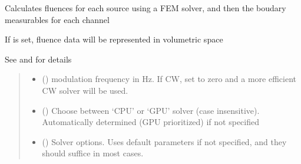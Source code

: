 \documentclass[letterpaper,10pt,english]{sphinxmanual}
\begin{document}
\begin{fulllineitems}
\begin{fulllineitems}
\label{\detokenize{_autosummary/nirfasterff.base.fluor_mesh.fluormesh:nirfasterff.base.fluor_mesh.fluormesh.femdata}}
\pysigstartsignatures
\pysiglinewithargsret
{}
{\sphinxparamcomma {}\sphinxparamcomma {}\sphinxparamcomma {}\sphinxparamcomma {}\sphinxparamcomma {}}
{}
\pysigstopsignatures
\sphinxAtStartPar
Calculates fluences for each source using a FEM solver, and then the boudary measurables for each channel

\sphinxAtStartPar
If  is set, fluence data will be represented in volumetric space

\sphinxAtStartPar
See {\hyperref[\detokenize{_autosummary/nirfasterff.forward.femdata.femdata_fl_CW:nirfasterff.forward.femdata.femdata_fl_CW}]{}} and {\hyperref[\detokenize{_autosummary/nirfasterff.forward.femdata.femdata_fl_FD:nirfasterff.forward.femdata.femdata_fl_FD}]{}} for details
\begin{quote}\begin{description}
\begin{itemize}
\item {} 
\sphinxAtStartPar
{} () \textendash{} modulation frequency in Hz. If CW, set to zero and a more efficient CW solver will be used.

\item {} 
\sphinxAtStartPar
{} (\sphinxstyleliteralemphasis{\sphinxupquote{, }}) \textendash{} Choose between ‘CPU’ or ‘GPU’ solver (case insensitive). Automatically determined (GPU prioritized) if not specified

\item {} 
\sphinxAtStartPar
{} ({\hyperref[\detokenize{_autosummary/nirfasterff.utils.SolverOptions:nirfasterff.utils.SolverOptions}]{}}\sphinxstyleliteralemphasis{\sphinxupquote{, }}) \textendash{} 
\sphinxAtStartPar
Solver options. Uses default parameters if not specified, and they should suffice in most cases.


\end{itemize}
\end{description}
\end{quote}
\end{fulllineitems}
\end{fulllineitems}
\end{document}
